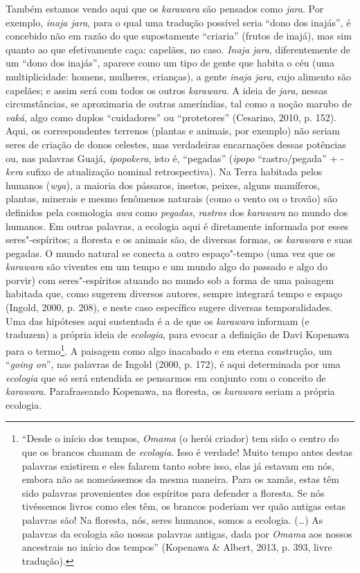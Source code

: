 Também estamos vendo aqui que os \emph{karawara} são pensados como
\emph{jara}. Por exemplo, \emph{inaja jara}, para o qual uma tradução
possível seria ``dono dos inajás'', é concebido não em razão do que
supostamente ``criaria'' (frutos de inajá), mas sim quanto ao que
efetivamente caça: capelães, no caso. \emph{Inaja jara}, diferentemente
de um ``dono dos inajás'', aparece como um tipo de gente que habita o céu
(uma multiplicidade: homens, mulheres, crianças), a gente \emph{inaja
jara}, cujo alimento são capelães; e assim será com todos os outros
\emph{karawara}. A ideia de \emph{jara,} nessas circunstâncias, se
aproximaria de outras ameríndias, tal como a noção marubo de
\emph{vaká}, algo como duplos ``cuidadores'' ou ``protetores'' (Cesarino,
2010, p. 152). Aqui, os correspondentes terrenos (plantas e animais, por
exemplo) não seriam seres de criação de donos celestes, mas verdadeiras
encarnações dessas potências ou, nas palavras Guajá, \emph{ipopokera},
isto é, ``pegadas'' (\emph{ipopo} ``rastro/pegada'' + -\emph{kera}
sufixo de atualização nominal retrospectiva). Na Terra habitada pelos
humanos (\emph{wya}), a maioria dos pássaros, insetos, peixes, alguns
mamíferos, plantas, minerais e mesmo fenômenos naturais (como o vento ou
o trovão) são definidos pela cosmologia \emph{awa} como \emph{pegadas},
\emph{rastros} dos \emph{karawara} no mundo dos humanos. Em outras
palavras, a ecologia aqui é diretamente informada por esses
seres"-espíritos; a floresta e os animais são, de diversas formas, os
\emph{karawara} e suas pegadas. O mundo natural se conecta a outro
espaço"-tempo (uma vez que os \emph{karawara} são viventes em um tempo e
um mundo algo do passado e algo do porvir) com seres"-espíritos atuando
no mundo sob a forma de uma paisagem habitada que, como sugerem diversos
autores, sempre integrará tempo e espaço (Ingold, 2000, p. 208), e neste
caso específico sugere diversas temporalidades. Uma das hipóteses aqui
sustentada é a de que os \emph{karawara} informam (e traduzem) a própria
ideia de \emph{ecologia}, para evocar a definição de Davi Kopenawa para
o termo\footnote{``Desde o início dos tempos, \emph{Omama} (o herói
  criador) tem sido o centro do que os brancos chamam de
  \emph{ecologia}. Isso é verdade! Muito tempo antes destas palavras
  existirem e eles falarem tanto sobre isso, elas já estavam em nós,
  embora não as nomeássemos da mesma maneira. Para os xamãs, estas têm
  sido palavras provenientes dos espíritos para defender a floresta. Se
  nós tivéssemos livros como eles têm, os brancos poderiam ver quão
  antigas estas palavras são! Na floresta, nós, seres humanos, somos a
  ecologia. (\ldots{}) As palavras da ecologia são nossas palavras antigas,
  dada por \emph{Omama} aos nossos ancestrais no início dos tempos''
  (Kopenawa \& Albert, 2013, p. 393, livre tradução).}. A paisagem como
algo inacabado e em eterna construção, um ``\emph{going on}'', nas
palavras de Ingold (2000, p. 172), é aqui determinada por uma
\emph{ecologia} que só será entendida se pensarmos em conjunto com o
conceito de \emph{karawara}. Parafraseando Kopenawa, na floresta, os
\emph{karawara} seriam a própria ecologia.

